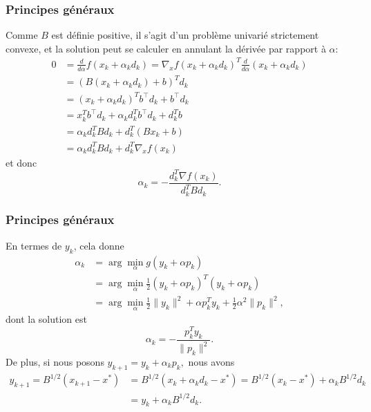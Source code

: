 \documentclass[usepdftitle=false,aspectratio=169]{beamer}
\begin{document}
\begin{frame}
\frametitle{Principes généraux}

Comme $B$ est définie positive, il s'agit d'un problème univarié strictement convexe, et la solution peut se calculer en annulant la dérivée par rapport à $\alpha$:
\begin{align*}
0 & = \frac{d}{d \alpha} f (x_k + \alpha_k d_k)
= \nabla_x f(x_k+\alpha_k d_k)^T \frac{d}{d \alpha} (x_k + \alpha_k d_k) \\
&= \left( B(x_k+\alpha_k d_k) + b \right)^T d_k \\
&= (x_k+\alpha_k d_k)^T b^\top d_k + b^\top d_k \\
&= x_k^Tb^\top d_k+ \alpha_k d_k^T b^\top d_k + d_k^Tb \\
&= \alpha_k d_k^T B d_k + d_k^T \left( Bx_k + b \right) \\
&= \alpha_k d_k^T B d_k + d_k^T \nabla_x f(x_k)
\end{align*}
et donc
$$
\alpha_k = - \frac{d_k^T \nabla f(x_k)}{d_k^T B d_k}.
$$

\mbox{}

\end{frame}

\begin{frame}
\frametitle{Principes généraux}

En termes de $y_k$, cela donne
\begin{align*}
\alpha_k &= \arg \min_{\alpha} g(y_k + \alpha p_k) \\
& = \arg \min_{\alpha} \frac{1}{2}(y_k + \alpha p_k)^T(y_k + \alpha p_k) \\
& = \arg \min_{\alpha} \frac{1}{2}\| y_k \|^2 + \alpha p_k^T y_k + \frac{1}{2}\alpha^2 \| p_k \|^2,
\end{align*}
dont la solution est
$$
\alpha_k = -\frac{p_k^T y_k}{\| p_k \|^2}.
$$
De plus, si nous posons
$
y_{k+1} = y_k + \alpha_k p_k,
$
nous avons
\begin{align*}
y_{k+1} = B^{1/2}(x_{k+1}-x^*)
& = B^{1/2}(x_k+\alpha_k d_k-x^*)
= B^{1/2}(x_k-x^*) + \alpha_k B^{1/2} d_k \\
& = y_k + \alpha_k B^{1/2} d_k.
\end{align*}

\end{frame}
\end{document}
